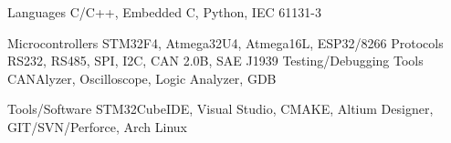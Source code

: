 


\begin{cvskills}


    \cvskill
    {Languages} %
    {C/C++, Embedded C, Python, IEC 61131-3} %

    \cvskill
    {Microcontrollers} %
    {STM32F4, Atmega32U4, Atmega16L, ESP32/8266}
    \cvskill
    {Protocols} %
    {RS232, RS485, SPI, I2C, CAN 2.0B, SAE J1939}
    \cvskill
    {Testing/Debugging Tools} %
    {CANAlyzer, Oscilloscope, Logic Analyzer, GDB}

    \cvskill
    {Tools/Software} %
    {STM32CubeIDE, Visual Studio, CMAKE, Altium Designer, GIT/SVN/Perforce, Arch Linux} %


\end{cvskills}
